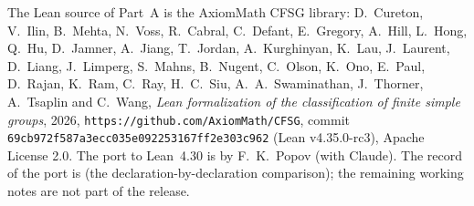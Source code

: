 The Lean source of Part~A is the AxiomMath CFSG library: D.~Cureton, V.~Ilin, B.~Mehta, N.~Voss, R.~Cabral,
C.~Defant, E.~Gregory, A.~Hill, L.~Hong, Q.~Hu, D.~Jamner, A.~Jiang, T.~Jordan, A.~Kurghinyan, K.~Lau,
J.~Laurent, D.~Liang, J.~Limperg, S.~Mahns, B.~Nugent, C.~Olson, K.~Ono, E.~Paul, D.~Rajan, K.~Ram, C.~Ray,
H.~C.~Siu, A.~A.~Swaminathan, J.~Thorner, A.~Tsaplin and C.~Wang, \emph{Lean formalization of the
classification of finite simple groups}, 2026, \texttt{https://github.com/AxiomMath/CFSG}, commit
\texttt{69cb972f587a3ecc035e092253167ff2e303c962} (Lean v4.35.0-rc3), Apache License 2.0.  The port to
Lean~4.30 is by F.~K.~Popov (with Claude).  The record of the port is
 (the declaration-by-declaration comparison); the
remaining working notes are not part of the release.
